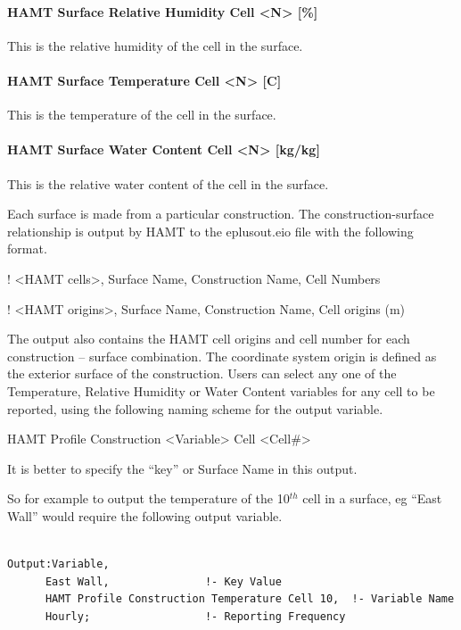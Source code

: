 \paragraph{HAMT Surface Relative Humidity Cell \textless{}N\textgreater{} {[}\%{]}}\label{hamt-surface-relative-humidity-cell-n-1}

This is the relative humidity of the cell in the surface.

\paragraph{HAMT Surface Temperature Cell \textless{}N\textgreater{} {[}C{]}}\label{hamt-surface-temperature-cell-n-c-1}

This is the temperature of the cell in the surface.

\paragraph{HAMT Surface Water Content Cell \textless{}N\textgreater{} {[}kg/kg{]}}\label{hamt-surface-water-content-cell-n-kgkg-1}

This is the relative water content of the cell in the surface.

Each surface is made from a particular construction. The construction-surface relationship is output by HAMT to the eplusout.eio file with the following format.

! \textless{}HAMT cells\textgreater{}, Surface Name, Construction Name, Cell Numbers

! \textless{}HAMT origins\textgreater{}, Surface Name, Construction Name, Cell origins (m)

The output also contains the HAMT cell origins and cell number for each construction -- surface combination. The coordinate system origin is defined as the exterior surface of the construction. Users can select any one of the Temperature, Relative Humidity or Water Content variables for any cell to be reported, using the following naming scheme for the output variable.

HAMT Profile Construction \textless{}Variable\textgreater{} Cell \textless{}Cell\#\textgreater{}

It is better to specify the ``key'' or Surface Name in this output.

So for example to output the temperature of the 10\(^{th}\) cell in a surface, eg ``East Wall'' would require the following output variable.

\begin{lstlisting}

Output:Variable,
      East Wall,               !- Key Value
      HAMT Profile Construction Temperature Cell 10,  !- Variable Name
      Hourly;                  !- Reporting Frequency
\end{lstlisting}

